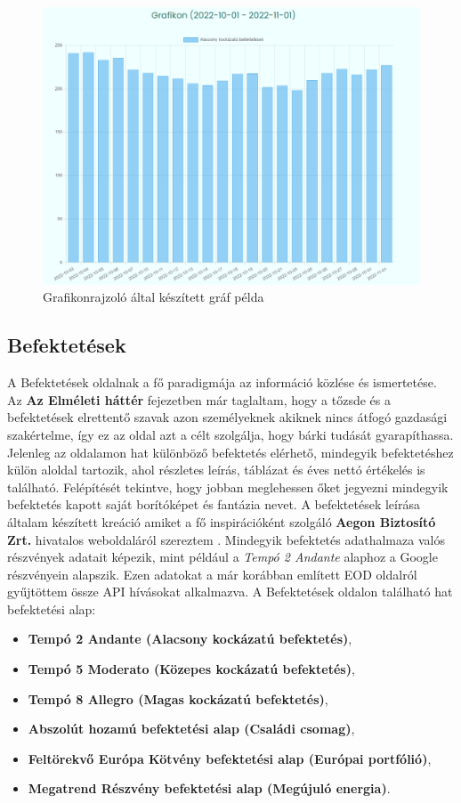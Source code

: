 \begin{figure}[h]
\centering
\includegraphics[scale=0.4]{images/graphPlotter.png}
\caption{Grafikonrajzoló által készített gráf példa}
\end{figure}

\subsection{Befektetések}

A Befektetések oldalnak a fő paradigmája az információ közlése és ismertetése. Az \textbf{Az Elméleti háttér} fejezetben már taglaltam, hogy a tőzsde és a befektetések elrettentő szavak azon személyeknek akiknek nincs átfogó gazdasági szakértelme, így ez az oldal azt a célt szolgálja, hogy bárki tudását gyarapíthassa. Jelenleg az oldalamon hat különböző befektetés elérhető, mindegyik befektetéshez külön aloldal tartozik, ahol részletes leírás, táblázat és éves nettó értékelés is található. Felépítését tekintve, hogy jobban meglehessen őket jegyezni mindegyik befektetés kapott saját borítóképet és fantázia nevet. A befektetések leírása általam készített kreáció amiket a fő inspirációként szolgáló \textbf{Aegon Biztosító Zrt.} hivatalos weboldaláról szereztem \cite{Aegon}. Mindegyik befektetés adathalmaza valós részvények adatait képezik, mint például a \emph{Tempó 2 Andante} alaphoz a Google részvényein alapszik. Ezen adatokat a már korábban említett EOD oldalról gyűjtöttem össze API hívásokat alkalmazva. \cite{eod} 
A Befektetések oldalon található hat befektetési alap:
\begin{itemize}
\item \textbf{Tempó 2 Andante (Alacsony kockázatú befektetés)},
\item \textbf{Tempó 5 Moderato (Közepes kockázatú befektetés)},
\item \textbf{Tempó 8 Allegro (Magas kockázatú befektetés)},
\item \textbf{Abszolút hozamú befektetési alap (Családi csomag)},
\item \textbf{Feltörekvő Európa Kötvény befektetési alap (Európai portfólió)},
\item \textbf{Megatrend Részvény befektetési alap (Megújuló energia)}. \cite{Aegon}
\end{itemize}

